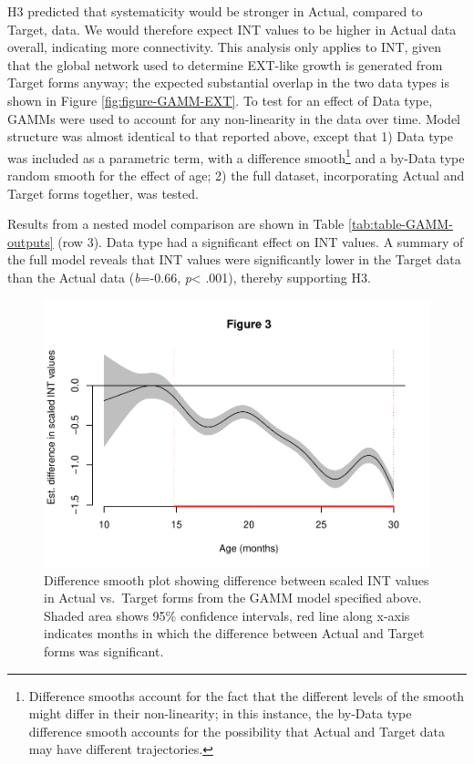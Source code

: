 \documentclass[
  man]{apa6}
\begin{document}
H3 predicted that systematicity would be stronger in Actual, compared to Target, data. We would therefore expect INT values to be higher in Actual data overall, indicating more connectivity. This analysis only applies to INT, given that the global network used to determine EXT-like growth is generated from Target forms anyway; the expected substantial overlap in the two data types is shown in Figure \ref{fig:figure-GAMM-EXT}. To test for an effect of Data type, GAMMs were used to account for any non-linearity in the data over time. Model structure was almost identical to that reported above, except that 1) Data type was included as a parametric term, with a difference smooth\footnote{Difference smooths account for the fact that the different levels of the smooth might differ in their non-linearity; in this instance, the by-Data type difference smooth accounts for the possibility that Actual and Target data may have different trajectories.} and a by-Data type random smooth for the effect of age; 2) the full dataset, incorporating Actual and Target forms together, was tested.

Results from a nested model comparison are shown in Table \ref{tab:table-GAMM-outputs} (row 3). Data type had a significant effect on INT values. A summary of the full model reveals that INT values were significantly lower in the Target data than the Actual data (\emph{b}=-0.66, \emph{p}\textless{} .001), thereby supporting H3.

\begin{figure}
\centering
\includegraphics{PhonNetworksProj-revised_files/figure-latex/difference-smooth-data-type-1.pdf}
\caption{\label{fig:difference-smooth-data-type}Difference smooth plot showing difference between scaled INT values in Actual vs.~Target forms from the GAMM model specified above. Shaded area shows 95\% confidence intervals, red line along x-axis indicates months in which
the difference between Actual and Target forms was significant.}
\end{figure}
\end{document}

